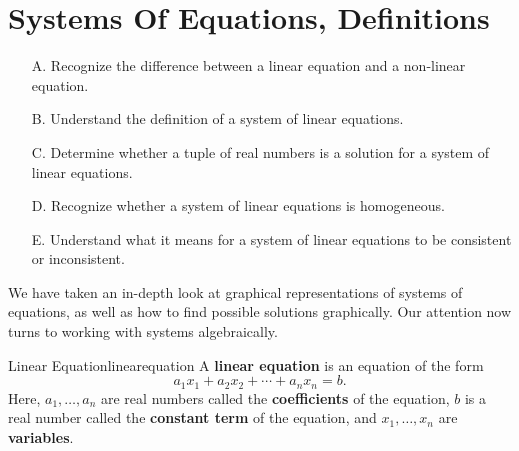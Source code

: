 \section{Systems Of Equations, Definitions}

\begin{outcome}
  \begin{enumerate}
  \item[A.] Recognize the difference between a linear equation and a
    non-linear equation.
  \item[B.] Understand the definition of a system of linear equations.
  \item[C.] Determine whether a tuple of real numbers is a solution
    for a system of linear equations.
  \item[D.] Recognize whether a system of linear equations is homogeneous.
  \item[E.] Understand what it means for a system of linear equations
    to be consistent or inconsistent.
  \end{enumerate}
\end{outcome}


We have taken an in-depth look at graphical representations of systems of equations, as well as how to find possible
solutions graphically. Our attention now turns to working with systems algebraically. 

\begin{definition}{Linear Equation}{linearequation}
A \textbf{linear equation}  is an equation of
the form
\begin{equation*}
  a_1x_1 + a_2x_2 + \cdots + a_nx_n = b.
\end{equation*}
Here, $a_1,\ldots,a_n$ are real numbers called the
\textbf{coefficients} of the equation, $b$ is a
real number called the \textbf{constant term}
of the equation, and $x_1,\ldots,x_n$ are
\textbf{variables}.
\end{definition}

